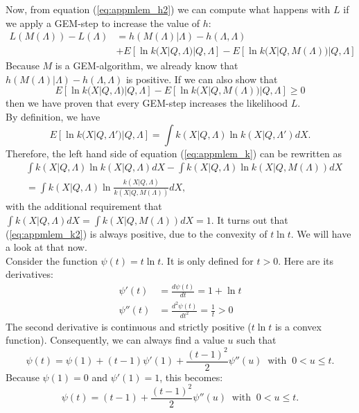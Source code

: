\documentclass[11pt,oneside]{book}
\begin{document}
Now, from equation (\ref{eq:appmlem_h2}) we can compute what happens with $L$
if we apply a GEM-step to increase the value of $h$:
\begin{align}
  L(M(\Lambda)) - L(\Lambda) &=
  h(M(\Lambda) | \Lambda) - h(\Lambda, \Lambda) \nonumber \\
  &  + E\left[\ln k(X | Q, \Lambda) | Q,\Lambda\right] 
       - E\left[\ln k(X | Q, M(\Lambda)) | Q,\Lambda\right] \label{eq:appmlem_l}
\end{align}
Because $M$ is a GEM-algorithm, we already know that $h(M(\Lambda) | \Lambda) -
h(\Lambda, \Lambda)$ is positive. If we can also show that
\begin{equation}
  E\left[\ln k(X | Q, \Lambda) | Q,\Lambda\right] 
   - E\left[\ln k(X | Q, M(\Lambda)) | Q,\Lambda\right] \geq 0 \label{eq:appmlem_k}
\end{equation}
then we have proven that every GEM-step increases the likelihood $L$.\\[3mm]

By definition, we have
\begin{equation}
  E\left[\ln k(X | Q, \Lambda') | Q,\Lambda\right] =
     \int k(X | Q, \Lambda) \ln k(X | Q, \Lambda') dX.
\end{equation}
Therefore, the left hand side of equation (\ref{eq:appmlem_k}) can be
rewritten as
\begin{align}
&  \int k(X | Q, \Lambda) \ln k(X | Q, \Lambda) dX 
  - \int k(X | Q, \Lambda) \ln k(X | Q, M(\Lambda)) dX \\
&= \int k(X | Q, \Lambda)
        \ln \frac{k(X | Q, \Lambda)}{k(X | Q, M(\Lambda))} dX, 
        \label{eq:appmlem_k2}
\end{align}
with the additional requirement that $\int k(X | Q, \Lambda) dX = \int k(X |
Q, M(\Lambda)) dX = 1$. It turns out that (\ref{eq:appmlem_k2}) is always
positive, due to the convexity of $t \ln t$. We will have a look at that
now.\\[3mm]

Consider the function $\psi(t) = t \ln t$. It is only defined for $t >
0$. Here are its derivatives:
\begin{align}
  \psi'(t) &= \frac{d \psi(t)}{dt} = 1 + \ln t\\
  \psi''(t) &= \frac{d^2 \psi(t)}{dt^2} = \frac{1}{t} > 0
\end{align}
The second derivative is continuous and strictly positive ($t \ln t$ is a
convex function). Consequently, we can always find a value $u$ such that
\begin{equation}
  \psi(t) = \psi(1) + (t - 1) \psi'(1) + \frac{(t-1)^2}{2} \psi''(u) 
       \;\; \mbox{with} \;\; 0 < u \leq t.
\end{equation}
Because $\psi(1) = 0$ and $\psi'(1) = 1$, this becomes:
\begin{equation}
  \psi(t) = (t - 1) + \frac{(t-1)^2}{2} \psi''(u) 
       \;\; \mbox{with} \;\; 0 < u \leq t.
\end{equation}
\end{document}

